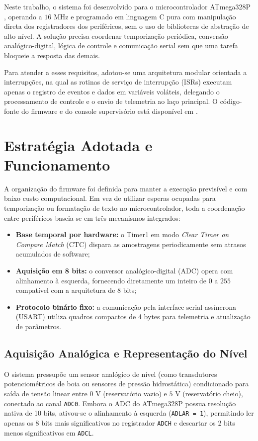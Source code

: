 \documentclass[conference]{IEEEtran}
\begin{document}
Neste trabalho, o sistema foi desenvolvido para o microcontrolador ATmega328P \cite{ref_atmel}, operando a $16\text{ MHz}$ e programado em linguagem C pura com manipulação direta dos registradores dos periféricos, sem o uso de bibliotecas de abstração de alto nível. A solução precisa coordenar temporização periódica, conversão analógico-digital, lógica de controle e comunicação serial sem que uma tarefa bloqueie a resposta das demais.

Para atender a esses requisitos, adotou-se uma arquitetura modular orientada a interrupções, na qual as rotinas de serviço de interrupção (ISRs) executam apenas o registro de eventos e dados em variáveis voláteis, delegando o processamento de controle e o envio de telemetria ao laço principal. O código-fonte do firmware e do console supervisório está disponível em \cite{monteiro_sismicro_u2}.

\section{Estratégia Adotada e Funcionamento}
A organização do firmware foi definida para manter a execução previsível e com baixo custo computacional. Em vez de utilizar esperas ocupadas para temporização ou formatação de texto no microcontrolador, toda a coordenação entre periféricos baseia-se em três mecanismos integrados:
\begin{itemize}
	\item \textbf{Base temporal por hardware:} o Timer1 em modo \textit{Clear Timer on Compare Match} (CTC) dispara as amostragens periodicamente sem atrasos acumulados de software;
	\item \textbf{Aquisição em 8 bits:} o conversor analógico-digital (ADC) opera com alinhamento à esquerda, fornecendo diretamente um inteiro de $0$ a $255$ compatível com a arquitetura de 8 bits;
	\item \textbf{Protocolo binário fixo:} a comunicação pela interface serial assíncrona (USART) utiliza quadros compactos de 4 bytes para telemetria e atualização de parâmetros.
\end{itemize}

\subsection{Aquisição Analógica e Representação do Nível}
O sistema pressupõe um sensor analógico de nível (como transdutores potenciométricos de boia ou sensores de pressão hidrostática) condicionado para saída de tensão linear entre $0\text{ V}$ (reservatório vazio) e $5\text{ V}$ (reservatório cheio), conectado ao canal \texttt{ADC0}. Embora o ADC do ATmega328P possua resolução nativa de 10 bits, ativou-se o alinhamento à esquerda (\texttt{ADLAR = 1}), permitindo ler apenas os 8 bits mais significativos no registrador \texttt{ADCH} e descartar os 2 bits menos significativos em \texttt{ADCL}.
\end{document}
